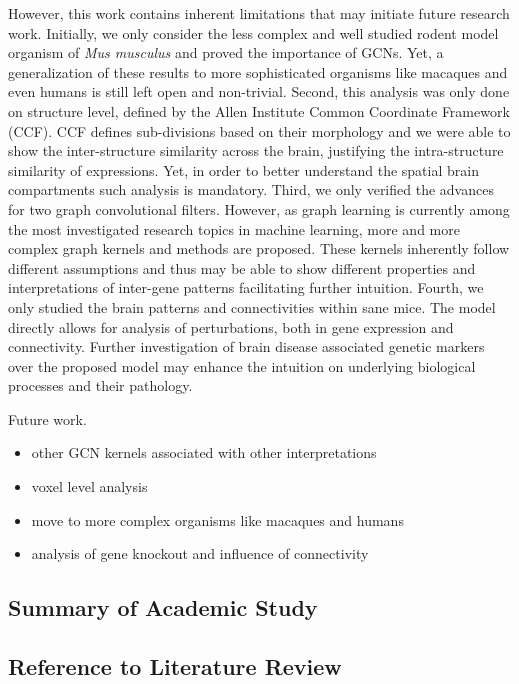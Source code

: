 \documentclass[]{article}
\begin{document}
However, this work contains inherent limitations that may initiate future research work. Initially, we only consider the less complex and well studied rodent model organism of \textit{Mus musculus} and proved the importance of GCNs. Yet, a generalization of these results to more sophisticated organisms like macaques and even humans is still left open and non-trivial. Second, this analysis was only done on structure level, defined by the Allen Institute Common Coordinate Framework (CCF). CCF defines sub-divisions based on their morphology and we were able to show the inter-structure similarity across the brain, justifying the intra-structure similarity of expressions. Yet, in order to better understand the spatial brain compartments such analysis is mandatory.
Third, we only verified the advances for two graph convolutional filters. However, as graph learning is currently among the most investigated research topics in machine learning, more and more complex graph kernels and methods are proposed. These kernels inherently follow different assumptions and thus may be able to show different properties and interpretations of inter-gene patterns facilitating further intuition. 
Fourth, we only studied the brain patterns and connectivities within sane mice. The model directly allows for analysis of perturbations, both in gene expression and connectivity. Further investigation of brain disease associated genetic markers over the proposed model may enhance the intuition on underlying biological processes and their pathology.

Future work.
\begin{itemize}
	\item other GCN kernels associated with other interpretations
	\item voxel level analysis
	\item move to more complex organisms like macaques and humans
	\item analysis of gene knockout and influence of connectivity
\end{itemize}





\subsection*{Summary of Academic Study}
\subsection*{Reference to Literature Review}
\end{document}
